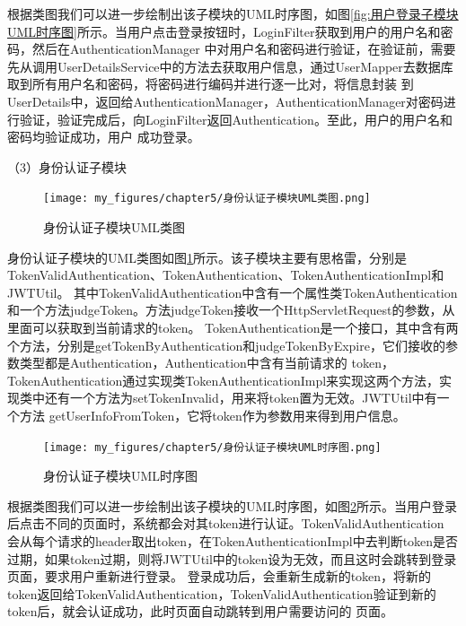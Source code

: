 根据类图我们可以进一步绘制出该子模块的UML时序图，如图\ref{fig:用户登录子模块UML时序图}所示。当用户点击登录按钮时，LoginFilter获取到用户的用户名和密码，然后在AuthenticationManager
中对用户名和密码进行验证，在验证前，需要先从调用UserDetailsService中的方法去获取用户信息，通过UserMapper去数据库取到所有用户名和密码，将密码进行编码并进行逐一比对，将信息封装
到UserDetails中，返回给AuthenticationManager，AuthenticationManager对密码进行验证，验证完成后，向LoginFilter返回Authentication。至此，用户的用户名和密码均验证成功，用户
成功登录。




（3）身份认证子模块

\begin{figure}[htb]
    \centering
    \texttt{[image: my\_figures/chapter5/身份认证子模块UML类图.png]}
    \caption{身份认证子模块UML类图}
    \label{fig:身份认证子模块UML类图}
\end{figure}

身份认证子模块的UML类图如图\ref{fig:身份认证子模块UML类图}所示。该子模块主要有思格雷，分别是TokenValidAuthentication、TokenAuthentication、TokenAuthenticationImpl和JWTUtil。
其中TokenValidAuthentication中含有一个属性类TokenAuthentication和一个方法judgeToken。方法judgeToken接收一个HttpServletRequest的参数，从里面可以获取到当前请求的token。
TokenAuthentication是一个接口，其中含有两个方法，分别是getTokenByAuthentication和judgeTokenByExpire，它们接收的参数类型都是Authentication，Authentication中含有当前请求的
token，TokenAuthentication通过实现类TokenAuthenticationImpl来实现这两个方法，实现类中还有一个方法为setTokenInvalid，用来将token置为无效。JWTUtil中有一个方法
getUserInfoFromToken，它将token作为参数用来得到用户信息。

\begin{figure}[htb]
    \centering
    \texttt{[image: my\_figures/chapter5/身份认证子模块UML时序图.png]}
    \caption{身份认证子模块UML时序图}
    \label{fig:身份认证子模块UML时序图}
\end{figure}

根据类图我们可以进一步绘制出该子模块的UML时序图，如图\ref{fig:身份认证子模块UML时序图}所示。当用户登录后点击不同的页面时，系统都会对其token进行认证。TokenValidAuthentication
会从每个请求的header取出token，在TokenAuthenticationImpl中去判断token是否过期，如果token过期，则将JWTUtil中的token设为无效，而且这时会跳转到登录页面，要求用户重新进行登录。
登录成功后，会重新生成新的token，将新的token返回给TokenValidAuthentication，TokenValidAuthentication验证到新的token后，就会认证成功，此时页面自动跳转到用户需要访问的
页面。




